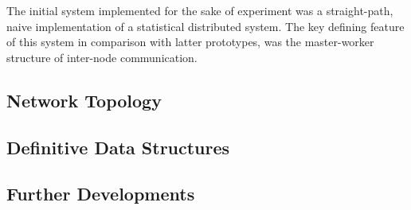 The initial system implemented for the sake of experiment was a straight-path, naive implementation of a statistical distributed system.
The key defining feature of this system in comparison with latter prototypes, was the master-worker structure of inter-node communication.

\subsection{Network Topology}\label{sec:mw-topo}

\subsection{Definitive Data Structures}\label{sec:mw-ds}

\subsection{Further Developments}\label{sec:further}

